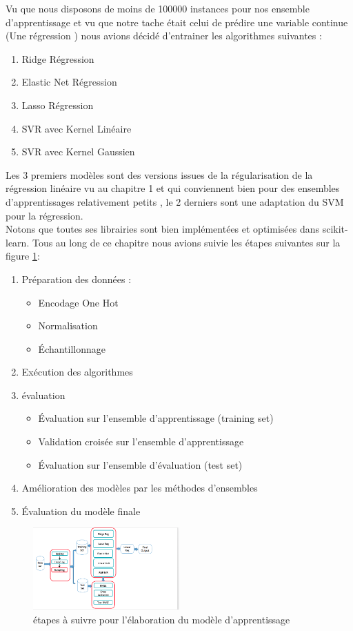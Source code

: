 Vu que nous disposons de moins de 100000 instances pour nos ensemble d'apprentissage et vu que notre tache était celui de prédire une variable continue (Une régression )  nous avions décidé d'entrainer les algorithmes  suivantes :
\begin{enumerate}
	\item Ridge Régression
	\item Elastic Net Régression
	\item Lasso Régression
	\item \ac{SVR} avec Kernel Linéaire
	\item  \ac{SVR} avec Kernel Gaussien 
\end{enumerate}
Les 3 premiers modèles sont des versions issues de la régularisation de la régression linéaire vu au chapitre 1  et qui conviennent bien pour des ensembles d'apprentissages relativement petits , le 2 derniers sont une adaptation du \ac{SVM} pour la régression.\\
Notons que toutes ses librairies sont bien implémentées et optimisées dans scikit-learn.
Tous au long de ce chapitre nous avions suivie les étapes suivantes  sur la figure \ref{fig:predictiveModelBuilding}:
 \begin{enumerate}
 \item Préparation des données :
 \begin{itemize}
 	\item  Encodage One Hot
 	\item  Normalisation
 	\item  Échantillonnage
 \end{itemize}
\item Exécution des algorithmes
\item évaluation 
   \begin{itemize}
  	\item  Évaluation sur l'ensemble d'apprentissage (training set)
  	\item  Validation croisée sur l'ensemble d'apprentissage
  	\item  Évaluation sur l'ensemble d'évaluation (test set) 
  \end{itemize}
\item Amélioration des modèles par les méthodes d'ensembles
\item Évaluation du modèle finale
 \end{enumerate}
\begin{figure}[ht]
	\centering
	\includegraphics[width=0.5\textwidth]{fig/ModelBuilding.png}
	\caption[Short caption]{étapes à suivre pour l'élaboration du modèle d'apprentissage }
	\label{fig:predictiveModelBuilding}
\end{figure} 

